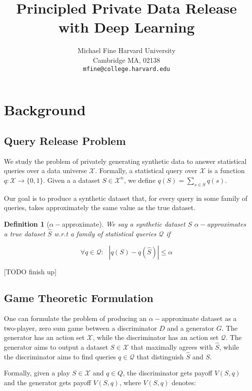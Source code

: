 \documentclass[]{article}
\author{%
  Michael Fine
  Harvard University\\
  Cambridge MA, 02138 \\
  \texttt{mfine@college.harvard.edu} 
}
\title{Principled Private Data Release with Deep Learning}
\newcommand{\X}{\mathcal{X}}
\newcommand{\Q}{\mathcal{Q}}
\newcommand{\B}{\{0,1\}}
\newtheorem{definition}{Definition}
\begin{document}
\maketitle



\section{Background}

\subsection{Query Release Problem}

We study the problem of privately generating synthetic data to answer statistical queries over a data universe $\X$. Formally, a statistical query over $\X$ is a function $q: \X \to \B$. Given a a dataset $S \in \X^n$, we define $q(S) = \sum_{s\in S} q(s)$.

Our goal is to produce a synthetic dataset that, for every query in some family of queries, takes approximately the same value as the true dataset.

\begin{definition}[$\alpha-$approximate]
    We say a synthetic dataset $S$ $\alpha-$approximates a true dataset $\hat S$ w.r.t a family of statistical queries $\Q$ if

    \begin{equation}
        \forall q \in \Q: ~~~ |q(S) - q(\hat S)| \leq \alpha
    \end{equation}
\end{definition}

[TODO finish up]

\subsection{Game Theoretic Formulation}

One can formulate the problem of producing an $\alpha-$approximate dataset as a two-player, zero sum game \cite{HRU13} between a discriminator $D$ and a generator $G$. The generator has an action set $\X$, while the discriminator has an action set $\Q$. The generator aims to output a dataset $S \in \X$ that maximally agrees with $\hat S$, while the discriminator aims to find queries $q \in \Q$ that distinguish $\hat S$ and $S$.

Formally, given a play $S \in \X$ and $q \in Q$, the discriminator gets payoff $V(S,q)$ and the generator gets payoff $V(S,q)$, where $V(S,q)$ denotes:
\end{document}
